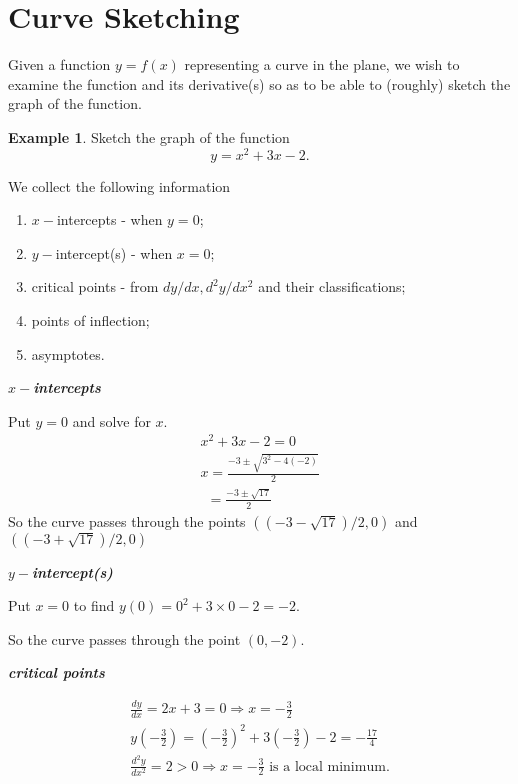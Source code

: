\documentclass[
  11pt,
  oneside]{book}
\providecommand{\tightlist}{%
  \setlength{\itemsep}{0pt}\setlength{\parskip}{0pt}}
\newcommand{\slide}{}
\theoremstyle{definition}
\theoremstyle{definition}
\newtheorem{example}{Example}[chapter]
\theoremstyle{definition}
\theoremstyle{definition}
\theoremstyle{remark}
\begin{document}
\section{Curve Sketching}\label{curve-sketching}

Given a function \(y=f(x)\) representing a curve in the plane, we wish to examine the function and its derivative(s) so as to be able to (roughly) sketch the graph of the function.

\begin{example}
Sketch the graph of the function
\[
y = x^2+3x-2.
\]
\end{example}

We collect the following information

\begin{enumerate}
\def\labelenumi{\arabic{enumi}.}
\tightlist
\item
  \(x-\)intercepts - when \(y=0\);
\item
  \(y-\)intercept(s) - when \(x = 0\);
\item
  critical points - from \(dy/dx, d^2y/dx^2\) and their classifications;
\item
  points of inflection;
\item
  asymptotes.
\end{enumerate}

\slide

\textbf{\emph{\(x-\)intercepts}}

Put \(y=0\) and solve for \(x\).
\begin{gather*}
x^2+3x-2 = 0\\
x = \frac{-3\pm\sqrt{3^2-4(-2)}}{2}\\
\ \ =\frac{-3\pm\sqrt{17}}{2}
\end{gather*}
So the curve passes through the points \(((-3-\sqrt{17})/2,0)\) and\(((-3+\sqrt{17})/2,0)\)

\textbf{\emph{\(y-\)intercept(s)}}

Put \(x=0\) to find \(y(0) = 0^2+3\times0-2 = -2\).

So the curve passes through the point \((0,-2)\).

\slide

\textbf{\emph{critical points}}

\begin{gather*}
\frac{dy}{dx} = 2x+3 = 0 \Rightarrow x = -\frac{3}{2}\\
y(-\frac32) = \left(-\frac32\right)^2 +3\left(-\frac 32\right) - 2 = -\frac{17}4\\
\frac{d^2y}{dx^2} = 2>0\Rightarrow x=-\frac 32\text{ is a local minimum}.
\end{gather*}
\end{document}
